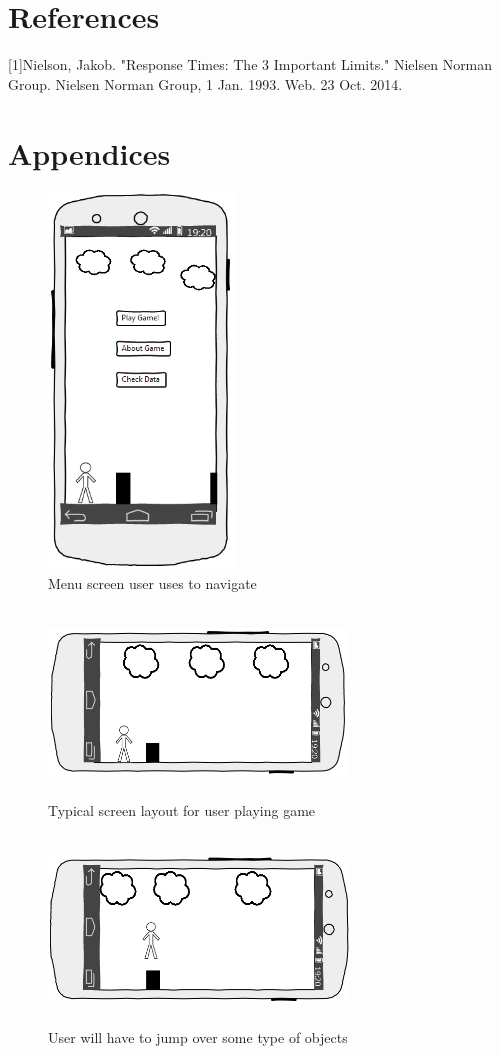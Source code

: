 \documentclass[a4wide]{article}
\begin{document}
\section{References}
[1]Nielson, Jakob. "Response Times: The 3 Important Limits." Nielsen Norman Group. Nielsen Norman Group, 1 Jan. 1993. Web. 23 Oct. 2014.
\section{Appendices}

\begin{figure}
\centering
\includegraphics[height=10cm, width = 5cm]{images/intro.png}
\caption{Menu screen user uses to navigate}
\label{fig:intro_image}
\end{figure}


\begin{figure}
\centering
\includegraphics[height=5cm, width = 8cm]{images/screen_layout.png}
\caption{Typical screen layout for user playing game}
\label{fig:screen_layout}
\end{figure}

\begin{figure}
\centering
\includegraphics[height=5cm, width = 8cm]{images/user_jumping.png}
\caption{User will have to jump over some type of objects}
\label{fig:user_jumping}
\end{figure}
\end{document}
